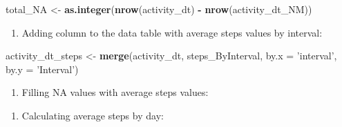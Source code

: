 \documentclass[
]{article}
\newenvironment{Shaded}{\begin{snugshade}}{\end{snugshade}}
\newcommand{\DataTypeTok}[1]{\textcolor[rgb]{0.13,0.29,0.53}{#1}}
\newcommand{\KeywordTok}[1]{\textcolor[rgb]{0.13,0.29,0.53}{\textbf{#1}}}
\newcommand{\NormalTok}[1]{#1}
\newcommand{\OperatorTok}[1]{\textcolor[rgb]{0.81,0.36,0.00}{\textbf{#1}}}
\newcommand{\StringTok}[1]{\textcolor[rgb]{0.31,0.60,0.02}{#1}}
\providecommand{\tightlist}{%
  \setlength{\itemsep}{0pt}\setlength{\parskip}{0pt}}
\begin{document}
\begin{Shaded}
\begin{Highlighting}[]
\NormalTok{total_NA <-}\StringTok{ }\KeywordTok{as.integer}\NormalTok{(}\KeywordTok{nrow}\NormalTok{(activity_dt) }\OperatorTok{-}\StringTok{ }\KeywordTok{nrow}\NormalTok{(activity_dt_NM))}
\end{Highlighting}
\end{Shaded}

\begin{enumerate}
\def\labelenumi{\arabic{enumi}.}
\setcounter{enumi}{1}
\tightlist
\item
  Adding column to the data table with average steps values by interval:
\end{enumerate}

\begin{Shaded}
\begin{Highlighting}[]
\NormalTok{activity_dt_steps <-}\StringTok{ }\KeywordTok{merge}\NormalTok{(activity_dt, steps_ByInterval, }\DataTypeTok{by.x =} \StringTok{'interval'}\NormalTok{, }\DataTypeTok{by.y =} \StringTok{'Interval'}\NormalTok{)}
\end{Highlighting}
\end{Shaded}

\begin{enumerate}
\def\labelenumi{\arabic{enumi}.}
\setcounter{enumi}{2}
\tightlist
\item
  Filling NA values with average steps values:
\end{enumerate}

\begin{Shaded}
\end{Shaded}

\begin{enumerate}
\def\labelenumi{\arabic{enumi}.}
\setcounter{enumi}{3}
\tightlist
\item
  Calculating average steps by day:
\end{enumerate}

\begin{Shaded}
\end{Shaded}
\end{document}
